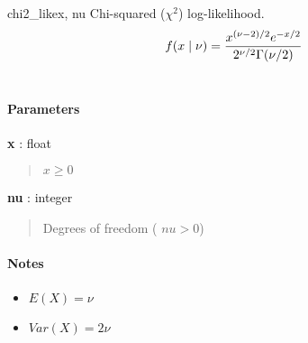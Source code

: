 \hypertarget{pymc.distributions.chi2_like}{}
\begin{funcdesc}{chi2\_like}{x, nu}
Chi-squared ($\chi^2$) log-likelihood.
\begin{gather}
\begin{split}f(x \mid \nu) = \frac{x^{(\nu-2)/2}e^{-x/2}}{2^{\nu/2}\Gamma(\nu/2)}\end{split}\notag\\\begin{split}\end{split}\notag
\end{gather}
\paragraph{Parameters}
\begin{paramlist}
\item[] \textbf{x} : float
\begin{quote}

$x \ge 0$
\end{quote}

\item[] \textbf{nu} : integer
\begin{quote}

Degrees of freedom ( $nu > 0$)
\end{quote}
\end{paramlist}
\paragraph{Notes}
\begin{itemize}
\item {} 
$E(X)=\nu$

\item {} 
$Var(X)=2\nu$

\end{itemize}
\end{funcdesc}

